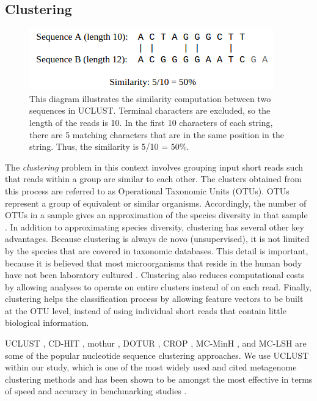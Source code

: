 \subsection{Clustering}

\begin{figure}[h]
\centering
\includegraphics[scale=0.5]{./uclust-similarity.png}
\caption{This diagram illustrates the similarity computation between two sequences in UCLUST. Terminal characters are excluded, so the length of the reads is 10. In the first 10 characters of each string, there are 5 matching characters that are in the same position in the string. Thus, the similarity is 5/10 = 50\%.} \label{uclust-similarity}
\end{figure}

The \emph{clustering} problem in this context  involves grouping input short reads  such that reads within a group are similar to each other. The clusters obtained from this process are referred to as Operational Taxonomic Units (OTUs). OTUs represent a group of equivalent or similar organisms. Accordingly, the number of OTUs in a sample gives an approximation of the species diversity in that sample  \cite{schloss2009introducing,schloss2005introducing,sun2009esprit}.
In addition to approximating species diversity, clustering has several other key advantages. Because clustering is always de novo (unsupervised), it is not limited by the species that are covered in taxonomic databases. This detail is important, because it is believed that most microorganisms that reside in the human body have not been laboratory cultured \cite{handelsman04}. Clustering also reduces computational costs by allowing analyses to operate on entire clusters instead of on each read. Finally, clustering helps the classification process by allowing feature vectors to be built at the OTU level, instead of using individual short reads that contain little biological information.

UCLUST \cite{Edgar10}, CD-HIT \cite{Li01072006}, mothur \cite{schloss2009introducing}, DOTUR \cite{schloss2005introducing}, CROP \cite{Hao01032011}, MC-MinH \cite{sdm2013a}, and 
MC-LSH \cite{bibm2012} are some of the popular  nucleotide sequence clustering approaches. We use UCLUST within our study, which is one of the most widely used and cited metagenome clustering methods and has been shown to be amongst the most effective in terms of speed and accuracy in benchmarking studies \cite{bonder090112, sun042711}. 
%

